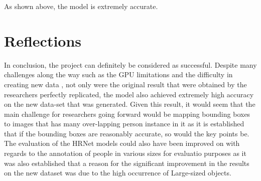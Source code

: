 \documentclass[a4paper,12pt]{article}
\begin{document}
As shown above, the model is extremely accurate. 


\section{Reflections} 

In conclusion, the project can definitely be considered as successful. Despite many challenges along the way such as the GPU limitations and the difficulty in creating new data , not only were the original result that were obtained by the researchers perfectly replicated, the model also achieved extremely high accuracy on the new data-set that was generated. Given this result, it would seem that the main challenge for researchers going forward would be mapping bounding boxes to images that has many over-lapping person instance in it as it is established that if the bounding boxes are reasonably accurate, so would the key points be. The evaluation of the HRNet models could also have been improved on with regards to the annotation of people in various sizes for evaluatio purposes as it was also established that a reason for the significant improvement in the results on the new dataset was due to the high occurrence of Large-sized objects.

\printbibliography
\end{document}
